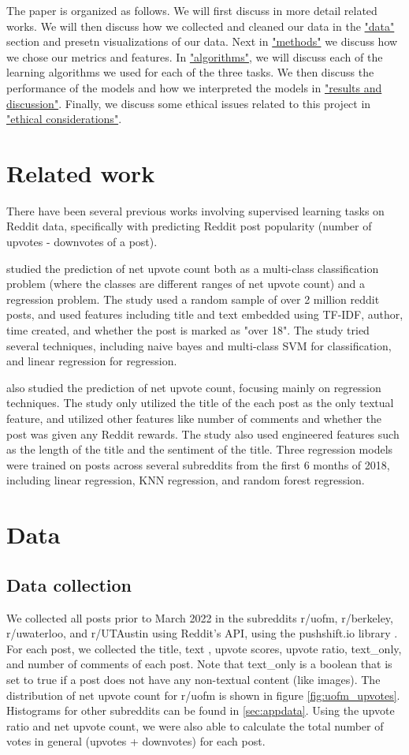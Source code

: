 \documentclass[11pt,a4paper]{article}
\let\Oldsection\section
\renewcommand{\section}{\FloatBarrier\Oldsection}
\let\Oldsubsection\subsection
\renewcommand{\subsection}{\FloatBarrier\Oldsubsection}
\begin{document}
    The paper is organized as follows. We will first discuss in more detail related works. We will then discuss how we collected and cleaned our data in the \hyperref[sec:data]{"data"} section and presetn visualizations of our data. Next in \hyperref[sec:methods]{"methods"} we discuss how we chose our metrics and features. In \hyperref[sec:algorithms]{"algorithms"}, we will discuss each of the learning algorithms we used for each of the three tasks. We then discuss the performance of the models and how we interpreted the models in \hyperref[sec:results]{"results and discussion"}. Finally, we discuss some ethical issues related to this project in \hyperref[sec:ethics]{"ethical considerations"}.



\Oldsection{Related work}
    There have been several previous works involving supervised learning tasks on Reddit data, specifically with predicting Reddit post popularity (number of upvotes - downvotes of a post).

    \citet{Segall2012} studied the prediction of net upvote count both as a multi-class classification problem (where the classes are different ranges of net upvote count) and a regression problem. The study used a random sample of over 2 million reddit posts, and used features including title and text embedded using TF-IDF, author, time created, and whether the post is marked as "over 18". The study tried several techniques, including naive bayes and multi-class SVM for classification, and linear regression for regression.
    
    \citet{Shuaibi2019} also studied the prediction of net upvote count, focusing mainly on regression techniques. The study only utilized the title of the each post as the only textual feature, and utilized other features like number of comments and whether the post was given any Reddit rewards. The study also used engineered features such as the length of the title and the sentiment of the title. Three regression models were trained on posts across several subreddits from the first 6 months of 2018, including linear regression, KNN regression, and random forest regression.



\Oldsection{Data}
\label{sec:data}

    \Oldsubsection{Data collection}
    We collected all posts prior to March 2022 in the subreddits r/uofm, r/berkeley, r/uwaterloo, and r/UTAustin using Reddit's API, using the pushshift.io library \citep{Pushshiftio2020}. For each post, we collected the title, text , upvote scores, upvote ratio, text\_only, and number of comments of each post. Note that text\_only is a boolean that is set to true if a post does not have any non-textual content (like images). The distribution of net upvote count for r/uofm is shown in figure \ref{fig:uofm_upvotes}. Histograms for other subreddits can be found in \ref{sec:appdata}. Using the upvote ratio and net upvote count, we were also able to calculate the total number of votes in general (upvotes + downvotes) for each post.
\end{document}
